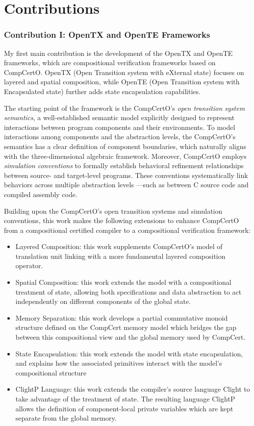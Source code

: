 \section{Contributions}

\subsubsection{Contribution I: OpenTX and OpenTE Frameworks}

My first main contribution
is the development of the OpenTX and OpenTE frameworks,
which are compositional verification frameworks
based on CompCertO.
OpenTX (Open Transition system with eXternal state)
focuses on layered and spatial composition,
while OpenTE (Open Transition system with Encapsulated state)
further adds state encapsulation capabilities.

The starting point of the framework is the CompCertO's
\emph{open transition system semantics},
a well-established semantic model
explicitly designed to represent interactions
between program components and their environments.
To model interactions among components
and the abstraction levels,
the CompCertO's semantics
has a clear definition of component boundaries,
which naturally aligns with
the three-dimensional algebraic framework.
Moreover,
CompCertO employs \emph{simulation conventions}
to formally establish behavioral refinement relationships
between source- and target-level programs.
These conventions systematically link behaviors
across multiple abstraction levels%
---such as between C source code and
compiled assembly code.

Building upon the CompCertO's open transition systems
and simulation conventions,
this work makes the following extensions
to enhance CompCertO
from a compositional certified compiler
to a compositional verification framework:
\begin{itemize}
  \item Layered Composition:
    this work supplements CompCertO's model of
    translation unit linking
    with a more fundamental layered composition operator.
  \item Spatial Composition:
    this work extends the model
    with a compositional treatment of state,
    allowing both specifications
    and data abstraction
    to act independently
    on different components of the global state.
  \item Memory Separation:
    this work develops a partial commutative monoid structure
    defined on the CompCert memory model
    which bridges the gap between this compositional view
    and the global memory used by CompCert.
  \item State Encapsulation:
    this work extends the model with state encapsulation,
    and explains how the associated primitives
    interact with the model's compositional structure
  \item ClightP Language:
    this work extends the compiler's source language Clight
    to take advantage of the treatment of state.
    The resulting language ClightP
    allows the definition of component-local private variables
    which are kept separate from the global memory.
\end{itemize}

